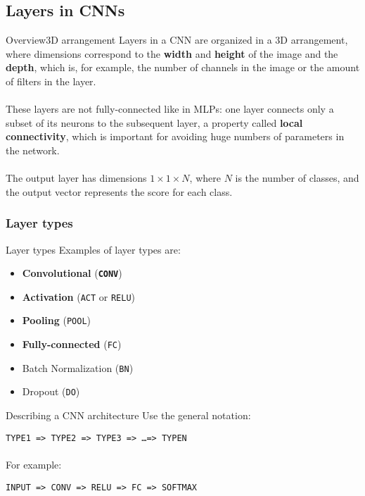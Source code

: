 \documentclass{beamer}
\begin{document}
\subsection{Layers in CNNs}

    \begin{frame}{Overview}{3D arrangement}
        Layers in a CNN are organized in a 3D arrangement, where dimensions
        correspond to the \textbf{width} and \textbf{height} of the image
        and the \textbf{depth}, which is, for example, the number of channels in the image
        or the amount of filters in the layer.\\~\\

        These layers are not fully-connected like in MLPs: one layer connects
        only a subset of its neurons to the subsequent layer, 
        a property called \textbf{local connectivity}, which
        is important for avoiding huge numbers of parameters in the network.\\~\\

        The output layer has dimensions $1 \times 1 \times N$, where $N$ is the
        number of classes, and the output vector represents the score for each class.

    \end{frame}

    \subsubsection{Layer types}
    \begin{frame}{Layer types}
        Examples of layer types are:
        \begin{itemize}
            \item \textbf{Convolutional} ({\bf \tt CONV})
            \item \textbf{Activation} ({\tt ACT} or {\tt RELU})
            \item \textbf{Pooling} ({\tt POOL})
            \item \textbf{Fully-connected} ({\tt FC})
            \item Batch Normalization ({\tt BN})
            \item Dropout ({\tt DO})
        \end{itemize}

        \begin{block}{Describing a CNN architecture}
            Use the general notation:

            {\tt TYPE1 => TYPE2 => TYPE3 => \ldots => TYPEN} \\~\\
            For example:

            {\tt INPUT => CONV => RELU => FC => SOFTMAX} \\~\\
        \end{block}
    \end{frame}
\end{document}
